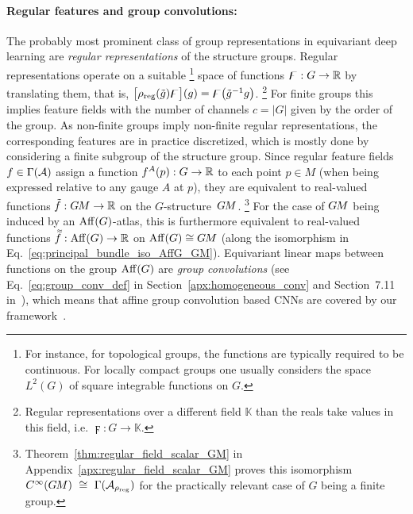 \paragraph{Regular features and group convolutions:}
The probably most prominent class of group representations in equivariant deep learning are \emph{regular representations} of the structure groups.
Regular representations operate on a suitable%
\footnote{
    For instance, for topological groups, the functions are typically required to be continuous.
    For locally compact groups one usually considers the space $L^2(G)$ of square integrable functions on $G$.
}
space of functions $\digamma: G \to \mathbb{R}$ by translating them, that is,
$\big[ \rho_\textup{reg} (\tilde{g}) \digamma \big](g) = \digamma\big( \tilde{g}^{-1}g \big)$.%
\footnote{
    Regular representations over a different field $\mathbb{K}$ than the reals take values in this field, i.e. $\digamma: G \to \mathbb{K}$.
}
For finite groups this implies feature fields with the number of channels $c = |G|$ given by the order of the group.
As non-finite groups imply non-finite regular representations, the corresponding features are in practice discretized, which is mostly done by considering a finite subgroup of the structure group.
Since regular feature fields $f \in \Gamma(\mathcal{A})$ assign a function $f^A(p): G \to \mathbb{R}$ to each point $p\in M$ (when being expressed relative to any gauge $A$ at $p$), they are equivalent to real-valued functions $\tilde{f}: G\mkern-1.4muM \to \mathbb{R}$ on the $G$-structure~$G\mkern-1.4muM$.%
\footnote{
    Theorem~\ref{thm:regular_field_scalar_GM} in Appendix~\ref{apx:regular_field_scalar_GM} proves this isomorphism
    $C^\infty(\GM)\ \cong\ \Gamma(\A_{\rho_\textup{reg}})$
    for the practically relevant case of $G$ being a finite group.
}
For the case of $G\mkern-1.4muM$ being induced by an $\operatorname{Aff}(G)$-atlas, this is furthermore equivalent to real-valued functions $\accentset{\approx}{f}: \operatorname{Aff}(G) \to \mathbb{R}$ on $\operatorname{Aff}(G) \cong G\mkern-1.4muM$ (along the isomorphism in Eq.~\eqref{eq:principal_bundle_iso_AffG_GM}).
Equivariant linear maps between functions on the group $\operatorname{Aff}(G)$ are \emph{group convolutions} (see Eq.~\eqref{eq:group_conv_def} in Section~\ref{apx:homogeneous_conv} and Section~7.11 in~\cite{gallier2019harmonicRepr}), which means that affine group convolution based CNNs are covered by our framework~\cite{Cohen2016-GCNN,Kondor2018-GENERAL,bekkers2020bspline}.


